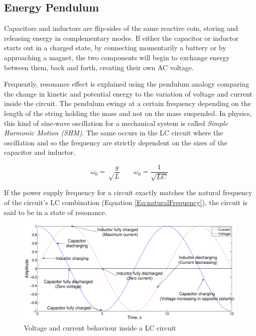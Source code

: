 		\subsection{Energy Pendulum}
Capacitors and inductors are flip-sides of the same reactive coin, storing and releasing energy in complementary modes. If either the capacitor or inductor starts out in a charged state, by connecting momentarily a battery or by approaching a magnet, the two components will begin to exchange energy between them, back and forth, creating their own AC voltage. 

Frequently, resonance effect is explained using the pendulum analogy comparing the change in kinetic and potential energy to the variation of voltage and current inside the circuit. The pendulum swings at a certain frequency depending on the length of the string holding the mass and not on the mass suspended. In physics, this kind of sine-wave oscillation for a mechanical system is called \textit{Simple Harmonic Motion (SHM)}. The same occurs in the LC circuit where the oscillation and so the frequency are strictly dependent on the sizes of the capacitor and inductor.

\begin{equation}
	\omega_{0} = \sqrt\frac{g}{L}
	\qquad
	\omega_{0} = \frac{1}{\sqrt{LC}}
\label{Eq:naturalFrequency}
\end{equation}

If the power supply frequency for a circuit exactly matches the natural frequency of the circuit's LC combination (Equation \ref{Eq:naturalFrequency}), the circuit is said to be in a state of resonance.

\begin{figure}[ht]
\begin{center}
	\includegraphics[width=1\textwidth]{./images/VoltageCurrent}
\caption{Voltage and current behaviour inside a LC circuit}
\label{F:VoltageCurrent}
\end{center}
\end{figure}

